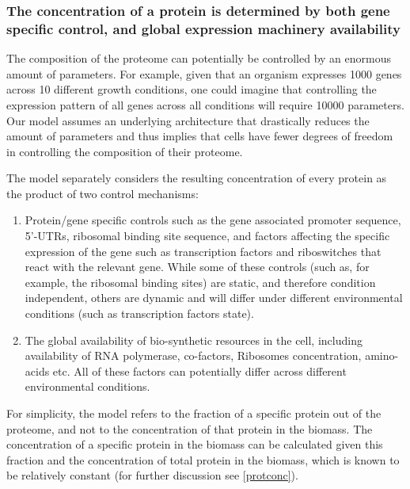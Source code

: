 \subsubsection{The concentration of a protein is determined by both gene specific control, and global
expression machinery availability}
The composition of the proteome can potentially be controlled by an enormous amount of parameters.
For example, given that an organism expresses 1000 genes across 10 different growth conditions, one could imagine that controlling the expression pattern of all genes across all conditions will require 10000 parameters.
Our model assumes an underlying architecture that drastically reduces the amount of parameters and thus implies that cells have fewer degrees of freedom in controlling the composition of their proteome.

The model separately considers the resulting concentration of every protein as the product of two control mechanisms:
\begin{enumerate}
\item Protein/gene specific controls such as the gene associated promoter sequence, 5'-UTRs, ribosomal binding site sequence, and factors affecting the specific expression of the gene such as transcription factors and riboswitches that react with the relevant gene.
  While some of these controls (such as, for example, the ribosomal binding sites) are static, and therefore condition independent, others are dynamic and will differ under different environmental conditions (such as transcription factors state).
\item The global availability of bio-synthetic resources in the cell, including availability of RNA polymerase, co-factors, Ribosomes concentration, amino-acids etc.
  All of these factors can potentially differ across different environmental conditions.
\end{enumerate}

For simplicity, the model refers to the fraction of a specific protein out of the proteome, and not to the concentration of that protein in the biomass.
The concentration of a specific protein in the biomass can be calculated given this fraction and the concentration of total protein in the biomass, which is known to be relatively constant \cite{Bremer1987,Scott2014} (for further discussion see \ref{protconc}).

